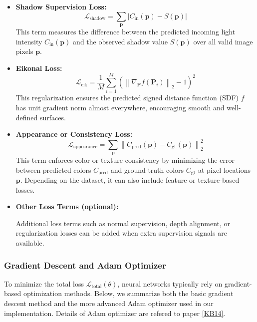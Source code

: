 \documentclass[12pt,a4paper]{article}
\theoremstyle{definition}
\begin{document}
\begin{itemize}
    \item \textbf{Shadow Supervision Loss:}
    \begin{equation}
    \mathcal{L}_{\text{shadow}} = \sum_{\mathbf{p}} \left| C_{\mathrm{in}}(\mathbf{p}) - S(\mathbf{p}) \right|
    \end{equation}
    This term measures the difference between the predicted incoming light intensity $C_{\mathrm{in}}(\mathbf{p})$ and the observed shadow value $S(\mathbf{p})$ over all valid image pixels $\mathbf{p}$.

    \item \textbf{Eikonal Loss:}
    \begin{equation}
    \mathcal{L}_{\text{eik}} = \frac{1}{M} \sum_{i=1}^M \left( \left\| \nabla_\mathbf{P} f(\mathbf{P}_i) \right\|_2 - 1 \right)^2
    \end{equation}
    This regularization ensures the predicted signed distance function (SDF) $f$ has unit gradient norm almost everywhere, encouraging smooth and well-defined surfaces.

    \item \textbf{Appearance or Consistency Loss:}
    \begin{equation}
    \mathcal{L}_{\text{appearance}} = \sum_{\mathbf{p}} \left\| C_{\text{pred}}(\mathbf{p}) - C_{\text{gt}}(\mathbf{p}) \right\|_2^2
    \end{equation}
    This term enforces color or texture consistency by minimizing the error between predicted colors $C_{\text{pred}}$ and ground-truth colors $C_{\text{gt}}$ at pixel locations $\mathbf{p}$. Depending on the dataset, it can also include feature or texture-based losses.

    \item \textbf{Other Loss Terms (optional):}
    
    Additional loss terms such as normal supervision, depth alignment, or regularization losses can be added when extra supervision signals are available.
\end{itemize}

\newpage

\subsubsection{Gradient Descent and Adam Optimizer} \label{sec:adam_optimizer}

To minimize the total loss $\mathcal{L}_{\text{total}}(\theta)$, neural networks typically rely on gradient-based optimization methods. Below, we summarize both the basic gradient descent method and the more advanced Adam optimizer used in our implementation. Details of Adam optimizer are refered to paper \hyperlink{[KB14]}{[KB14]}.
\end{document}
